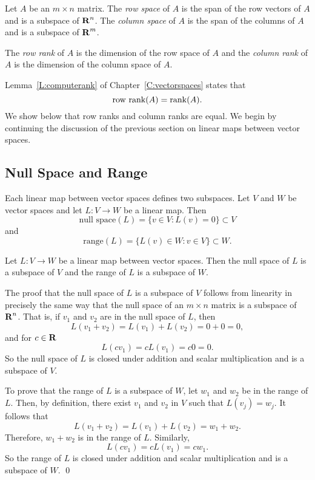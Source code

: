  \label{S:5.8}

Let $A$ be an $m\times n$ matrix.  The {\em row space\/}
 of $A$ is the span of the row vectors of $A$
and is a subspace of $\mbox{$\bf{R}$}^n$.  The {\em column space\/}
 of $A$ is the span of the columns of $A$
and is a subspace of $\mbox{$\bf{R}$}^m$.
\begin{Def} 
The {\em row rank\/} of $A$ is the dimension of the
row space of $A$ and the {\em column rank\/} of $A$ is the
dimension of the column space of $A$.
\end{Def}   
Lemma~\ref{L:computerank} of Chapter~\ref{C:vectorspaces} states that
\[
\mbox{row rank}(A) = {\rm rank}(A).
\]
We show below that row ranks and column ranks are equal.  We
begin by continuing the discussion of the previous section on linear maps
between vector spaces.

\subsection*{Null Space and Range}

Each linear map between vector spaces defines two subspaces.  Let $V$ and $W$ 
be vector spaces and let $L:V\to W$ be a linear map.  Then
\[
\mbox{null space}(L) = \{v\in V: L(v)=0\} \subset V
\]
 and 
\[
\mbox{range}(L) = \{L(v)\in W: v\in V \} \subset W.
\]

\begin{lemma} \label{L:nsr}
Let $L:V\to W$ be a linear map between vector spaces.  Then the null space of
$L$ is a subspace of $V$ and the range of $L$ is a subspace of $W$.
\end{lemma}

\proof  The proof that the null space of $L$ is a subspace of $V$ follows
from linearity in precisely the same way that the null space of an
$m\times n$ matrix is a subspace of $\mbox{$\bf{R}$}^n$.  That is, if $v_1$ and $v_2$ are
in the null space of $L$, then
\[
L(v_1+v_2) = L(v_1) + L(v_2) = 0 + 0 = 0,
\]
and for $c\in\mbox{$\bf{R}$}$
\[
L(cv_1) = cL(v_1) = c0 = 0.
\]
So the null space of $L$ is closed under addition and scalar multiplication
and is a subspace of $V$.

To prove that the range of $L$ is a subspace of $W$, let $w_1$ and $w_2$ be
in the range of $L$.  Then, by definition, there exist $v_1$ and $v_2$ in $V$
such that $L(v_j)=w_j$.  It follows that
\[
L(v_1+v_2) = L(v_1) + L(v_2) = w_1 + w_2.
\]
Therefore, $w_1+w_2$ is in the range of $L$.  Similarly,
\[
L(cv_1) = cL(v_1) = cw_1.
\]
So the range of $L$ is closed under addition and scalar multiplication and is
a subspace of $W$.  \qed

